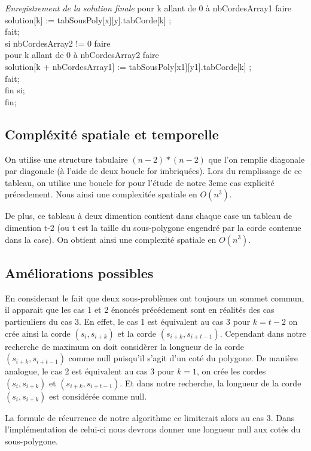 \documentclass[a4paper,10pt]{article}
\begin{document}
\begin{tabbing}
\textit{Enregistrement de la solution finale}
pour k allant de 0 à nbCordesArray1 faire \\
  \> solution[k] := tabSousPoly[x][y].tabCorde[k] ; \\
fait; \\
si nbCordesArray2 != 0 faire \\
  \> pour k allant de 0 à nbCordesArray2 faire \\
    \> \> solution[k + nbCordesArray1] := tabSousPoly[x1][y1].tabCorde[k] ; \\
  \> fait;\\
fin si; \\
fin; \\
\end{tabbing}
 
\subsection{Compléxité spatiale et temporelle}
On utilise une structure tabulaire \((n-2)*(n-2)\) que l'on remplie diagonale par diagonale (à l'aide de deux boucle for imbriquées).
Lors du remplissage de ce tableau, on utilise une boucle for pour l'étude de notre 3eme cas explicité précedement. 
Nous ainsi une complexitée spatiale en $O(n^3)$.

De plus, ce tableau à deux dimention contient dans chaque case un tableau de dimention t-2 (ou t est la taille du sous-polygone engendré par la corde contenue dans la case).
On obtient ainsi une complexité spatiale en $O(n^3)$.


\subsection{Améliorations possibles}

En considerant le fait que deux sous-problèmes ont toujours un sommet commun, il apparait que les cas 1 et 2 énoncés précédement sont en réalités des cas particuliers du cas 3.
En effet, le cas 1 est équivalent au cas 3 pour $k=t-2$ on crée ainsi la corde $(s_{i}, s_{i+k})$ et la corde $(s_{i+k}, s_{i+t-1})$.
Cependant dans notre recherche de maximum on doit considèrer la longueur de la corde $(s_{i+k}, s_{i+t-1})$ comme null puisqu'il s'agit d'un coté du polygone.
De manière analogue, le cas 2 est équivalent au cas 3 pour $k=1$, on crée les cordes $(s_{i}, s_{i+k})$ et $(s_{i+k}, s_{i+t-1})$.
Et dans notre recherche, la longueur de la corde $(s_{i}, s_{i+k})$ est considérée comme null.

La formule de récurrence de notre algorithme ce limiterait alors au cas 3. Dans l'implémentation de celui-ci nous devrons donner une longueur null aux cotés du sous-polygone. 
\end{document}
